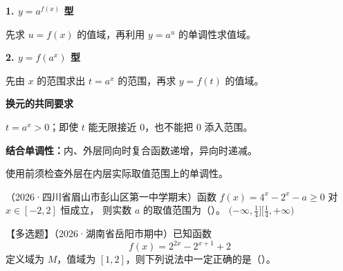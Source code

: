 \begin{frame}[t,label=BmethodV]
  \textbf{1. $y=a^{f(x)}$ 型}
  \par 先求 $u=f(x)$ 的值域，再利用 $y=a^u$ 的单调性求值域。
  \pause
  \par\vspace{0.25cm}
  \textbf{2. $y=f(a^x)$ 型}
  \par 先由 $x$ 的范围求出 $t=a^x$ 的范围，再求 $y=f(t)$ 的值域。
  \par\vspace{0.25cm}
  \textbf{换元的共同要求}
  \par $t=a^x>0$；即使 $t$ 能无限接近 $0$，也不能把 $0$ 添入范围。
  \pause
  \par\vspace{0.25cm}
  \textbf{结合单调性：}内、外层同向时复合函数递增，异向时递减。
  \par 使用前须检查外层在内层实际取值范围上的单调性。
\end{frame}

\begin{frame}[t,label=BV7q]
  （2026·四川省眉山市彭山区第一中学期末）函数
  $f(x)=4^x-2^x-a\ge0$ 对 $x\in[-2,2]$ 恒成立，
  则实数 $a$ 的取值范围为（\quad）。
  \Choices{$(-\infty,-\frac14]$}{$[-\frac14,+\infty)$}
          {$(-\infty,\frac14]$}{$[\frac14,+\infty)$}
  \pause
\end{frame}

\begin{frame}[t,label=BV8q]
  【多选题】（2026·湖南省岳阳市期中）已知函数
  \[
    f(x)=2^{2x}-2^{x+1}+2
  \]
  定义域为 $M$，值域为 $[1,2]$，则下列说法中一定正确的是（\quad）。
  \Choices{$M=[0,2]$}{$M\subseteq(-\infty,1]$}{$0\in M$}{$1\in M$}
  \pause
\end{frame}

